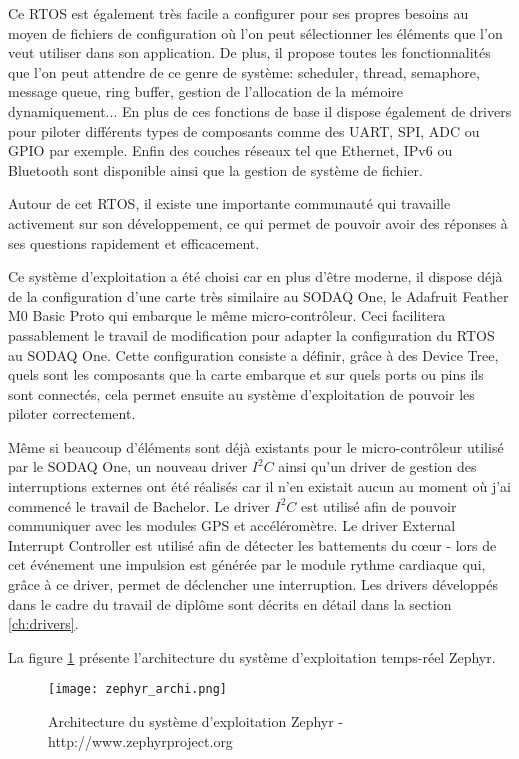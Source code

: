 Ce RTOS est également très facile a configurer pour ses propres besoins au moyen de fichiers de configuration où l'on peut sélectionner les éléments que l'on veut utiliser dans son application. De plus, il propose toutes les fonctionnalités que l'on peut attendre de ce genre de système: scheduler, thread, semaphore, message queue, ring buffer, gestion de l'allocation de la mémoire dynamiquement...
En plus de ces fonctions de base il dispose également de drivers pour piloter différents types de composants comme des UART, SPI, ADC ou GPIO par exemple. Enfin des couches réseaux tel que Ethernet, IPv6 ou Bluetooth sont disponible ainsi que la gestion de système de fichier. \cite{zephyr_web}

Autour de cet RTOS, il existe une importante communauté qui travaille activement sur son développement, ce qui permet de pouvoir avoir des réponses à ses questions rapidement et efficacement.

Ce système d'exploitation a été choisi car en plus d'être moderne, il dispose déjà de la configuration d'une carte très similaire au SODAQ One, le Adafruit Feather M0 Basic Proto qui embarque le même micro-contrôleur. Ceci facilitera passablement le travail de modification pour adapter la configuration du RTOS au SODAQ One. Cette configuration consiste a définir, grâce à des Device Tree, quels sont les composants que la carte embarque et sur quels ports ou pins ils sont connectés, cela permet ensuite au système d'exploitation de pouvoir les piloter correctement.

Même si beaucoup d'éléments sont déjà existants pour le micro-contrôleur utilisé par le SODAQ One, un nouveau driver $I^{2}C$ ainsi qu'un driver de gestion des interruptions externes ont été réalisés car il n'en existait aucun au moment où j'ai commencé le travail de Bachelor. Le driver $I^{2}C$ est utilisé afin de pouvoir communiquer avec les modules GPS et accéléromètre. Le driver External Interrupt Controller est utilisé afin de détecter les battements du cœur - lors de cet événement une impulsion est générée par le module rythme cardiaque qui, grâce à ce driver, permet de déclencher une interruption. Les drivers développés dans le cadre du travail de diplôme sont décrits en détail dans la section \ref{ch:drivers}.

La figure \ref{fig:zephyr_archi} présente l'architecture du système d'exploitation temps-réel Zephyr.

\begin{figure}[htb]
\centering 
\texttt{[image: zephyr\_archi.png]} 
\caption{Architecture du système d'exploitation Zephyr - http://www.zephyrproject.org}
\label{fig:zephyr_archi}
\end{figure}

